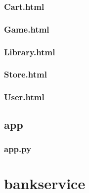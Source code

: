 \documentclass[letterpaper,10pt,english]{sphinxmanual}
\begin{document}
\subsubsection{Cart.html}
\label{\detokenize{store-service:cart-html}}

\subsubsection{Game.html}
\label{\detokenize{store-service:game-html}}

\subsubsection{Library.html}
\label{\detokenize{store-service:library-html}}

\subsubsection{Store.html}
\label{\detokenize{store-service:store-html}}

\subsubsection{User.html}
\label{\detokenize{store-service:user-html}}

\subsection{app}
\label{\detokenize{store-service:app}}

\subsubsection{app.py}
\label{\detokenize{store-service:module-app}}\label{\detokenize{store-service:app-py}}

\begin{fulllineitems}
\label{\detokenize{store-service:app.hello_world}}
\pysigstartsignatures
\pysiglinewithargsret
{}
{}
{}
\pysigstopsignatures
\end{fulllineitems}


\sphinxstepscope


\section{bank\sphinxhyphen{}service}
\label{\detokenize{bank-service:bank-service}}\label{\detokenize{bank-service::doc}}
\end{document}
